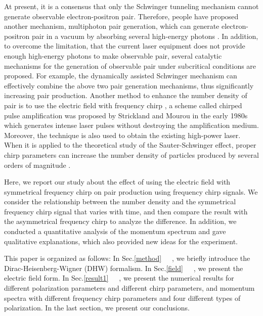 \documentclass[aps,preprint,superscriptaddress]{revtex4}
\begin{document}
At present, it is a consensus that only the Schwinger tunneling mechanism cannot generate observable electron-positron pair. Therefore, people have proposed another mechanism, multiphoton pair generation, which can generate electron-positron pair in a vacuum by absorbing several high-energy photons \cite{Mocken:2010moc,Akal:2014al}. In addition, to overcome the limitation, that the current laser equipment does not provide enough high-energy photons to make observable pair, several catalytic mechanisms for the generation of observable pair under subcritical conditions are proposed. For example, the dynamically assisted Schwinger mechanism \cite{Li:2014pp,Schutzhold:2008pz,Abdukerim:2012ke} can effectively combine the above two pair generation mechanisms, thus significantly increasing pair production. Another method to enhance the number density of pair is to use the electric field with frequency chirp \cite{Dumlu:2010vv,Jiang:2013vb,Abdukerim:2017cp,Olugh:2019pd}, a scheme called chirped pulse amplification was proposed by Strickland and Mourou \cite{Strickland} in the early 1980s which generates intense laser pulses without destroying the amplification medium. Moreover, the technique is also used to obtain the existing high-power laser. When it is applied to the theoretical study of the Sauter-Schwinger effect, proper chirp parameters can increase the number density of particles produced by several orders of magnitude \cite{Jiang:2013vb,Abdukerim:2017cp,Olugh:2019pd}.

Here, we report our study about the effect of using the electric field with symmetrical frequency chirp on pair production using frequency chirp signals. We consider the relationship between the number density and the symmetrical frequency chirp signal that varies with time, and then compare the result with the asymmetrical frequency chirp to analyze the difference. In addition, we conducted a quantitative analysis of the momentum spectrum and gave qualitative explanations, which also provided new ideas for the experiment.


This paper is organized as follows: In Sec.\ref{method}~~~, we briefly introduce the Dirac-Heisenberg-Wigner (DHW) formalism. In Sec.\ref{field}~~~, we present the electric field form. In Sec.\ref{result1}~~~, we present the numerical results for different polarization parameters and different chirp parameters, and momentum spectra with different frequency chirp parameters and four different types of polarization. In the last section, we present our conclusions.
\end{document}
